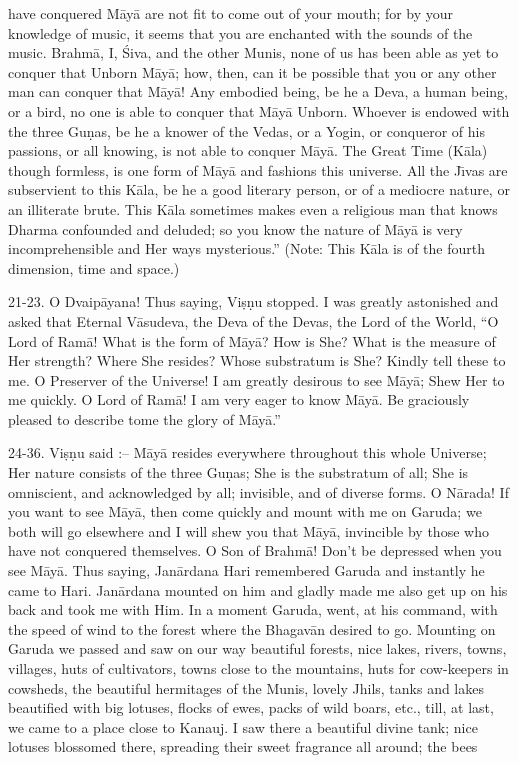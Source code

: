 have conquered M\=ay\=a are not fit to come out of your mouth; for by your knowledge of music, it seems that you are enchanted with the sounds of the music. Brahm\=a, I, \'Siva, and the other Munis, none of us has been able as yet to conquer that Unborn M\=ay\=a; how, then, can it be possible that you or any other man can conquer that M\=ay\=a! Any embodied being, be he a Deva, a human being, or a bird, no one is able to conquer that M\=ay\=a Unborn. Whoever is endowed with the three Gu\d{n}as, be he a knower of the Vedas, or a Yogin, or conqueror of his passions, or all knowing, is not able to conquer M\=ay\=a. The Great Time (K\=ala) though formless, is one form of M\=ay\=a and fashions this universe. All the J\={\i}vas are subservient to this K\=ala, be he a good literary person, or of a mediocre nature, or an illiterate brute. This K\=ala sometimes makes even a religious man that knows Dharma confounded and deluded; so you know the nature of M\=ay\=a is very incomprehensible and Her ways mysterious.'' (Note: This K\=ala is of the fourth dimension, time and space.)

21-23. O Dvaip\=ayana! Thus saying, Vi\d{s}\d{n}u stopped. I was greatly astonished and asked that Eternal V\=asudeva, the Deva of the Devas, the Lord of the World, ``O Lord of Ram\=a! What is the form of M\=ay\=a? How is She? What is the measure of Her strength? Where She resides? Whose substratum is She? Kindly tell these to me. O Preserver of the Universe! I am greatly desirous to see M\=ay\=a; Shew Her to me quickly. O Lord of Ram\=a! I am very eager to know M\=ay\=a. Be graciously pleased to describe tome the glory of M\=ay\=a.''

24-36. Vi\d{s}\d{n}u said :-- M\=ay\=a resides everywhere throughout this whole Universe; Her nature consists of the three Gu\d{n}as; She is the substratum of all; She is omniscient, and acknowledged by all; invisible, and of diverse forms. O N\=arada! If you want to see M\=ay\=a, then come quickly and mount with me on Garuda; we both will go elsewhere and I will shew you that M\=ay\=a, invincible by those who have not conquered themselves. O Son of Brahm\=a! Don't be depressed when you see M\=ay\=a. Thus saying, Jan\=ardana Hari remembered Garuda and instantly he came to Hari. Jan\=ardana mounted on him and gladly made me also get up on his back and took me with Him. In a moment Garuda, went, at his command, with the speed of wind to the forest where the Bhagav\=an desired to go. Mounting on Garuda we passed and saw on our way beautiful forests, nice lakes, rivers, towns, villages, huts of cultivators, towns close to the mountains, huts for cow-keepers in cowsheds, the beautiful hermitages of the Munis, lovely Jhils, tanks and lakes beautified with big lotuses, flocks of ewes, packs of wild boars, etc., till, at last, we came to a place close to Kanauj. I saw there a beautiful divine tank; nice lotuses blossomed there, spreading their sweet fragrance all around; the bees

